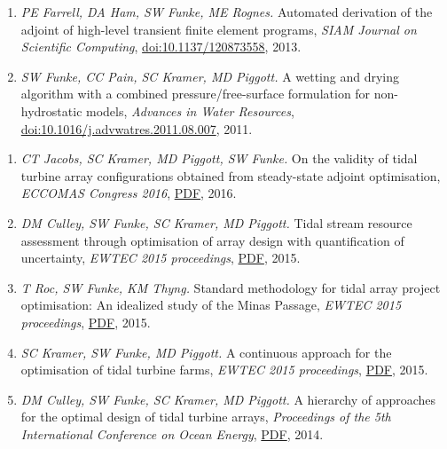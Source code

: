 \documentclass[11pt]{article}
\begin{document}
\begin{enumerate}
\item \textit{PE Farrell, DA Ham, SW Funke, ME Rognes.} Automated derivation of the adjoint of high-level transient finite element programs, \textit{SIAM Journal on Scientific Computing}, \href{https://doi.org/10.1016/10.1137/120873558}{doi:10.1137/120873558}, 2013.
\item \textit{SW Funke, CC Pain, SC Kramer, MD Piggott.} A wetting and drying algorithm with a combined pressure/free-surface formulation for non-hydrostatic models, \textit{Advances in Water Resources}, \href{https://doi.org/10.1016/j.advwatres.2011.08.007}{doi:10.1016/j.advwatres.2011.08.007}, 2011.
\end{enumerate}

\begin{enumerate}
    \item \textit{CT Jacobs, SC Kramer, MD Piggott, SW Funke.} On the validity of tidal turbine array configurations obtained from steady-state adjoint optimisation, \textit{ECCOMAS Congress 2016}, \href{https://github.com/funsim/cv/raw/master/publications/jacobs_eccomas_2016.pdf}{PDF}, 2016.
    \item \textit{DM Culley, SW Funke, SC Kramer, MD Piggott.} Tidal stream resource assessment through optimisation of array design with quantification of uncertainty, \textit{EWTEC 2015 proceedings}, \href{https://github.com/funsim/cv/raw/master/publications/culley_ewtec_2015.pdf}{PDF}, 2015.
    \item \textit{T Roc, SW Funke, KM Thyng.} Standard methodology for tidal array project optimisation: An idealized study of the Minas Passage, \textit{EWTEC 2015 proceedings}, \href{https://github.com/funsim/cv/raw/master/publications/roc_ewtec_2015.pdf}{PDF}, 2015.
    \item \textit{SC Kramer, SW Funke, MD Piggott.} A continuous approach for the optimisation of tidal turbine farms, \textit{EWTEC 2015 proceedings}, \href{https://github.com/funsim/cv/raw/master/publications/kramer_ewtec_2015.pdf}{PDF}, 2015.
    \item \textit{DM Culley, SW Funke, SC Kramer, MD Piggott.} A hierarchy of approaches for the optimal design of tidal turbine arrays, \textit{Proceedings of the 5th International Conference on Ocean Energy}, \href{https://github.com/funsim/cv/raw/master/publications/culley_ewtec_2015.pdf}{PDF}, 2014.
\end{enumerate}
\end{document}
